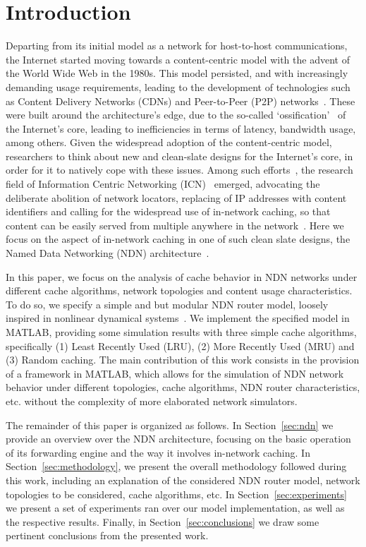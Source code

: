\section{Introduction}
\label{sec:intro}

Departing from its initial model as a network for host-to-host communications, 
the Internet started moving towards a content-centric model with the advent of 
the World Wide Web in the 1980s. This model persisted, 
and with increasingly demanding usage requirements, leading to the 
development of technologies such as 
Content Delivery Networks (CDNs) and Peer-to-Peer (P2P) 
networks~\cite{Passarella20121}. These were built around the architecture's 
edge, due to the so-called 
`ossification'~\cite{Handley:2006:WIO:1188052.1188101} of the Internet's core, 
leading to inefficiencies in terms of latency, bandwidth usage, among others. 
Given the widespread adoption of the content-centric model, 
researchers to think about new and clean-slate designs 
for the Internet's core, in order for it to natively cope with these issues. Among 
such efforts~\cite{5936152}, the research field of Information Centric Networking 
(ICN)~\cite{Xylomenos2013} emerged, 
advocating the deliberate abolition of network locators, replacing of IP 
addresses with content identifiers and calling for the widespread use of 
in-network caching, so that content can be easily served from multiple 
anywhere in the network~\cite{Koponen2007,Jacobson2009,Trossen2012,
Raychaudhuri2012,Han2012,Dannewitz:2013:NII:2459510.2459643}. Here we focus on the aspect of 
in-network caching in one of such clean slate designs, 
the Named Data Networking (NDN) architecture~\cite{Jacobson2009}.\shortvertbreak

In this paper, we focus on the analysis of cache behavior in NDN 
networks under different cache algorithms, network topologies and content 
usage characteristics. To do so, we specify a simple and but modular NDN router 
model, loosely inspired in nonlinear dynamical 
systems~\cite{Hedrick2010}. We implement the specified model in MATLAB\textsuperscript{\textregistered}, providing 
some simulation results with three simple cache algorithms, specifically (1) Least Recently 
Used (LRU), (2) More Recently Used (MRU) and (3) Random caching. The main contribution 
of this work consists in the provision of a framework in MATLAB\textsuperscript{\textregistered}, 
which allows for the simulation of NDN network behavior under different 
topologies, cache algorithms, NDN router characteristics, etc. without 
the complexity of more elaborated network simulators.\shortvertbreak

The remainder of this paper is organized as follows. In Section~\ref{sec:ndn} we provide an 
overview over the NDN architecture, focusing on the basic operation of its 
forwarding engine and the way it involves in-network caching. In 
Section~\ref{sec:methodology}, we present the overall methodology followed 
during this work, including an explanation of the considered NDN router model, 
network topologies to be considered, cache algorithms, etc. In Section~\ref{sec:experiments} we present a set of 
experiments ran over our model implementation, as well as the respective 
results. Finally, in Section~\ref{sec:conclusions} we draw some pertinent 
conclusions from the presented work.
